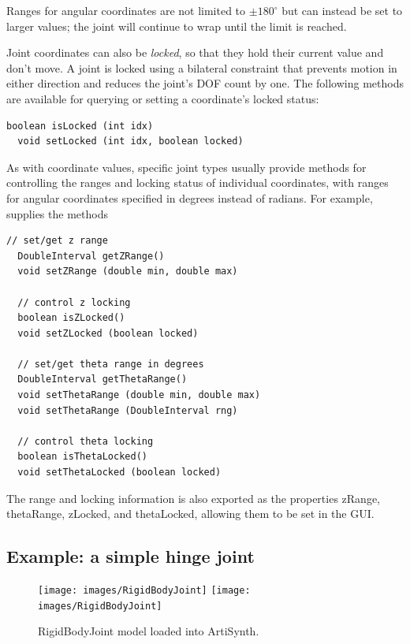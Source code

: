 \begin{sideblock}
Ranges for angular coordinates are not limited to $\pm 180^\circ$ but
can instead be set to larger values; the joint will continue to wrap
until the limit is reached.
\end{sideblock}

Joint coordinates can also be {\it locked}, so that they hold their
current value and don't move. A joint is locked using a bilateral
constraint that prevents motion in either direction and reduces the
joint's DOF count by one.  The following methods are available for
querying or setting a coordinate's locked status:
\begin{lstlisting}[]
  boolean isLocked (int idx)	
  void setLocked (int idx, boolean locked)
\end{lstlisting}
%

As with coordinate values, specific joint types usually provide
methods for controlling the ranges and locking status of individual
coordinates, with ranges for angular coordinates specified in degrees
instead of radians.  For example,
supplies the methods
\begin{lstlisting}[]
  // set/get z range
  DoubleInterval getZRange()
  void setZRange (double min, double max)

  // control z locking
  boolean isZLocked()
  void setZLocked (boolean locked)

  // set/get theta range in degrees
  DoubleInterval getThetaRange()
  void setThetaRange (double min, double max)
  void setThetaRange (DoubleInterval rng)

  // control theta locking
  boolean isThetaLocked()
  void setThetaLocked (boolean locked)
\end{lstlisting}
%
The range and locking information is also exported as the properties
{\sf zRange}, {\sf thetaRange}, {\sf zLocked}, and {\sf thetaLocked},
allowing them to be set in the GUI.

\subsection{Example: a simple hinge joint}
\label{RigidBodyJoint:sec}

\begin{figure}[ht]
\begin{center}
\iflatexml
 \texttt{[image: images/RigidBodyJoint]}
\else
 \texttt{[image: images/RigidBodyJoint]}
\fi
\end{center}
\caption{RigidBodyJoint model loaded into ArtiSynth.}
\label{RigidBodyJoint:fig}
\end{figure}

